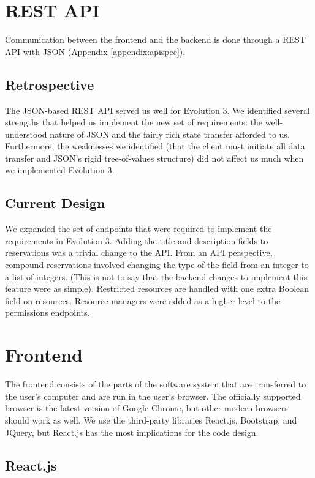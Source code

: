 \documentclass[12pt]{article}
\begin{document}
\section{REST API}
\label{sec:REST}
Communication between the frontend and the backend is done through a REST API with JSON (\hyperref[appendix:apispec]{Appendix \ref{appendix:apispec}}).

\subsection{Retrospective}
The JSON-based REST API served us well for Evolution 3. We identified several strengths that helped us implement the new set of requirements: the well-understood nature of JSON and the fairly rich state transfer afforded to us. Furthermore, the weaknesses we identified (that the client must initiate all data transfer and JSON's rigid tree-of-values structure) did not affect us much when we implemented Evolution 3.

\subsection{Current Design}
We expanded the set of endpoints that were required to implement the requirements in Evolution 3. Adding the title and description fields to reservations was a trivial change to the API. From an API perspective, compound reservations involved changing the type of the field from an integer to a list of integers. (This is not to say that the backend changes to implement this feature were as simple). Restricted resources are handled with one extra Boolean field on resources. Resource managers were added as a higher level to the permissions endpoints.

\section{Frontend}
\label{sec:Frontend}
The frontend consists of the parts of the software system that are transferred to the user's computer and are run in the user's browser. The officially supported browser is the latest version of Google Chrome, but other modern browsers should work as well. We use the third-party libraries React.js, Bootstrap, and JQuery, but React.js has the most implications for the code design.

\subsection{React.js}
\end{document}
